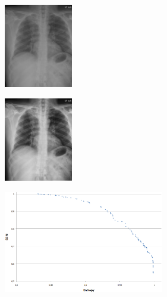 \documentclass[spanish,twocolumn]{article}
\begin{document}
{\begin{minipage}[b]{1.0\linewidth}
\end{minipage}

\begin{minipage}[b]{1.0\linewidth}
  
   \begin{minipage}[t]{0.3\linewidth}  
        \centering
        \includegraphics[width=3cm]{Figures/1000_IM-0003-1001.png}
    \end{minipage}
  \hspace{1pt}
   \begin{minipage}[t]{0.3\linewidth}  
        \centering
        \includegraphics[width=3cm]{Figures/8178-1000_IM-0003-1001.png}
    \end{minipage}
    \vspace{0.5cm}
   \begin{minipage}[t]{0.3\linewidth}  
        \centering
        \includegraphics[width=7cm]{Figures/pareto_1000_IM-0003-1001.png}
    \end{minipage}
  \vspace{0.5cm}
    \label{fig:resultado2}


\end{minipage}}
\end{document}
